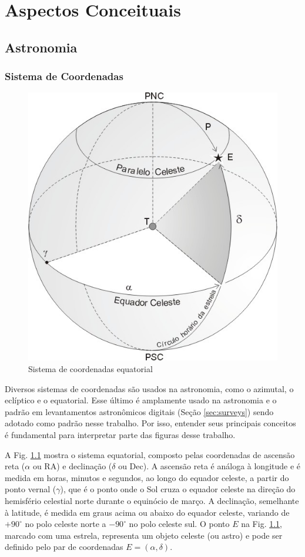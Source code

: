\chapter{Aspectos Conceituais}
\label{cap:conceitos}

\begin{overview}
  \lipsum[1]
\end{overview}


\section{Astronomia}
\label{sec:astro}


\subsection{Sistema de Coordenadas}
\label{sec:sistema-coordenadas}

\begin{figure}[!ht]
  \centering
  \caption{Sistema de coordenadas equatorial}
  \label{fig:sistema-equatorial}
  \includegraphics[width=0.58\linewidth]{figures/coords.png}
\end{figure}

Diversos sistemas de coordenadas são usados na astronomia, como o azimutal, o eclíptico e o equatorial. Esse último é amplamente usado na astronomia e o padrão em levantamentos astronômicos digitais (Seção \ref{sec:surveys}) sendo adotado como padrão nesse trabalho. Por isso, entender seus principais conceitos é fundamental para interpretar parte das figuras desse trabalho.

A Fig. \ref{fig:sistema-equatorial} mostra o sistema equatorial, composto pelas coordenadas de ascensão reta ($\alpha$ ou RA) e declinação ($\delta$ ou Dec). A ascensão reta é análoga à longitude e é medida em horas, minutos e segundos, ao longo do equador celeste, a partir do ponto vernal ($\gamma$), que é o ponto onde o Sol cruza o equador celeste na direção do hemisfério celestial norte durante o equinócio de março. A declinação, semelhante à latitude, é medida em graus acima ou abaixo do equador celeste, variando de $+90^{\circ}$ no polo celeste norte a $-90^{\circ}$ no polo celeste sul. O ponto $E$ na Fig. \ref{fig:sistema-equatorial}, marcado com uma estrela, representa um objeto celeste (ou astro) e pode ser definido pelo par de coordenadas $E = (\alpha, \delta)$.


